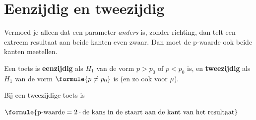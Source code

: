 \begin{oefeningen}
\end{oefeningen}

\section{Eenzijdig en tweezijdig}

Vermoed je alleen dat een parameter \textit{anders} is, zonder richting, dan telt een extreem resultaat aan beide kanten even zwaar. Dan moet de p-waarde ook beide kanten meetellen.

\begin{theorie}
Een toets is \textbf{\textcolor{accent}{eenzijdig}} als $H_1$ van de vorm $p > p_0$ of $p < p_0$ is, en \textbf{\textcolor{accent}{tweezijdig}} als $H_1$ van de vorm $\formule{p \neq p_0}$ is (en zo ook voor $\mu$).

\vspace{1mm}
Bij een tweezijdige toets is

\vspace{1mm}
\qquad $\formule{\text{p-waarde} = 2 \cdot \text{de kans in de staart aan de kant van het resultaat}}$
\end{theorie}

